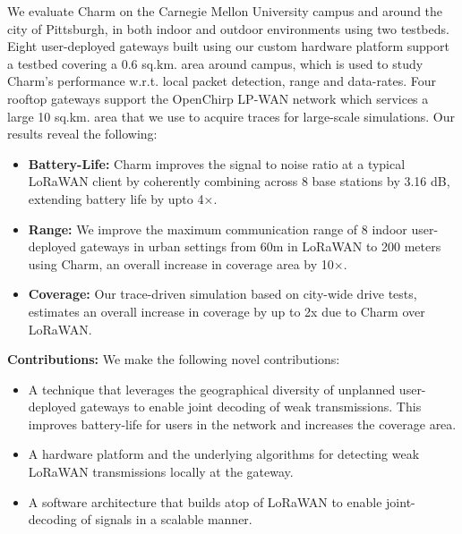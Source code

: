 We evaluate Charm on the Carnegie Mellon University campus and around the city
of Pittsburgh, in both indoor and outdoor environments using two testbeds.
Eight user-deployed gateways built using our custom hardware platform support
a testbed covering a 0.6 sq.km. area around campus, which is used to study
Charm's performance w.r.t. local packet detection, range and data-rates. Four
rooftop gateways support the OpenChirp LP-WAN network which services a large
10 sq.km. area that we use to acquire traces for large-scale simulations. Our
results reveal the following:

\begin{itemize}
    \item {\bf Battery-Life: }Charm improves the signal to noise ratio at a
        typical LoRaWAN client by coherently combining across 8 base stations
        by 3.16 dB, extending battery life by upto 4$\times$.
    \item {\bf Range: } We improve the maximum communication range of 8 indoor
        user-deployed gateways in urban settings from 60m in LoRaWAN to 200
        meters using Charm, an overall increase in coverage area by
        10$\times$.
    \item {\bf Coverage: } Our trace-driven simulation based on city-wide
        drive tests, estimates an overall increase in coverage by up to 2x due
        to Charm over LoRaWAN.
\end{itemize}

\noindent \textbf{Contributions:} We make the following novel contributions:
\begin{itemize}
    \item A technique that leverages the geographical diversity of unplanned
        user-deployed gateways to enable joint decoding of weak transmissions.
        This improves battery-life for users in the network and increases the
        coverage area.
    \item A hardware platform and the underlying algorithms for detecting weak
        LoRaWAN transmissions locally at the gateway.
    \item A software architecture that builds atop of LoRaWAN to enable
        joint-decoding of signals in a scalable manner.
\end{itemize}